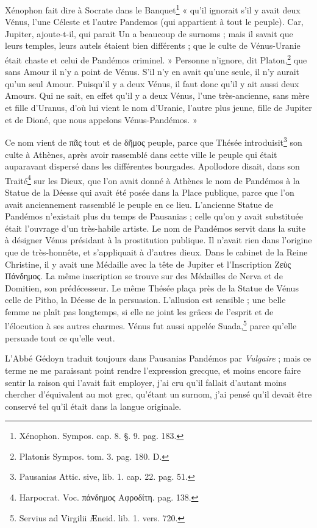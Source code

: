 \documentclass[a4paper, 11pt, oneside, polutonikogreek, french]{article}
\begin{document}
Xénophon fait dire à Socrate dans le Banquet\footnote{Xénophon. Sympos. cap. 8. §. 9. pag. 183.} « qu'il ignorait s'il y avait deux Vénus, l'une Céleste et l'autre Pandemos (qui appartient à tout le peuple). Car, Jupiter, ajoute-t-il, qui parait Un a beaucoup de surnoms ; mais il savait que leurs temples, leurs autels étaient bien différents ; que le culte de Vénus-Uranie était chaste et celui de Pandémos criminel. » Personne n'ignore, dit Platon,\footnote{Platonis Sympos. tom. 3. pag. 180. D.} que sans Amour il n'y a point de Vénus. S'il n'y en avait qu'une seule, il n'y aurait qu'un seul Amour. Puisqu'il y a deux Vénus, il faut donc qu'il y ait aussi deux Amours. Qui ne sait, en effet qu'il y a deux Vénus, l'une très-ancienne, sans mère et fille d'Uranus, d'où lui vient le nom d'Uranie, l'autre plus jeune, fille de Jupiter et de Dioné, que nous appelons Vénus-Pandémos. »

Ce nom vient de πᾶς tout et de δῆμος peuple, parce que Thésée introduisit\footnote{Pausanias Attic. sive, lib. 1. cap. 22. pag. 51.} son culte à Athènes, après avoir rassemblé dans cette ville le peuple qui était auparavant dispersé dans les différentes bourgades. Apollodore disait, dans son Traité\footnote{Harpocrat. Voc. πάνδημος Αφροδίτη. pag. 138.} sur les Dieux, que l'on avait donné à Athènes le nom de Pandémos à la Statue de la Déesse qui avait été posée dans la Place publique, parce que l'on avait anciennement rassemblé le peuple en ce lieu. L'ancienne Statue de Pandémos n'existait plus du temps de Pausanias ; celle qu'on y avait substituée était l'ouvrage d'un très-habile artiste. Le nom de Pandémos servit dans la suite à désigner Vénus présidant à la prostitution publique. Il n'avait rien dans l'origine que de très-honnête, et s'appliquait à d'autres dieux. Dans le cabinet de la Reine Christine, il y avait une Médaille avec la tête de Jupiter et l'Inscription Ζεὺς Πάνδημος. La même inscription se trouve sur des Médailles de Nerva et de Domitien, son prédécesseur. Le même Thésée plaça près de la Statue de Vénus celle de Pitho, la Déesse de la persuasion. L'allusion est sensible ; une belle femme ne plaît pas longtemps, si elle ne joint les grâces de l'esprit et de l'élocution à ses autres charmes. Vénus fut aussi appelée Suada,\footnote{Servius ad Virgilii Æneid. lib. 1. vers. 720.} parce qu'elle persuade tout ce qu'elle veut.

L'Abbé Gédoyn traduit toujours dans Pausanias Pandémos par \emph{Vulgaire} ; mais ce terme ne me paraissant point rendre l'expression grecque, et moins encore faire sentir la raison qui l'avait fait employer, j'ai cru qu'il fallait d'autant moins chercher d'équivalent au mot grec, qu'étant un surnom, j'ai pensé qu'il devait être conservé tel qu'il était dans la langue originale.
\end{document}
